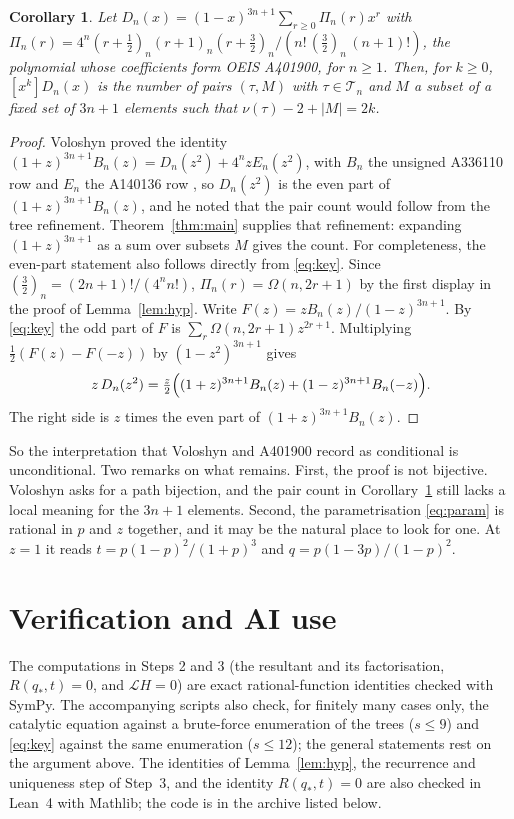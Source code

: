 \documentclass[11pt]{amsart}
\newtheorem{corollary}[theorem]{Corollary}
\theoremstyle{remark}
\newcommand{\Om}{\Omega}
\begin{document}
\begin{corollary}\label{cor:a401900}
Let $D_n(x) = (1-x)^{3n+1}\sum_{r \ge 0}\Pi_n(r)x^r$ with
$\Pi_n(r) = 4^n (r+\frac12)_n (r+1)_n (r+\frac32)_n/(n!\,(\frac32)_n\,(n+1)!)$, the polynomial whose coefficients
form OEIS A401900, for $n \ge 1$. Then, for $k \ge 0$, $[x^k]D_n(x)$ is the number of
pairs $(\tau, M)$ with $\tau \in \mathcal T_n$ and $M$ a subset of a fixed set of $3n+1$ elements such that
$\nu(\tau) - 2 + |M| = 2k$.
\end{corollary}
\begin{proof}
Voloshyn proved the identity $(1+z)^{3n+1}B_n(z) = D_n(z^2) + 4^n z E_n(z^2)$, with $B_n$ the unsigned A336110
row and $E_n$ the A140136 row \cite[eq.~(64)]{V1}, so $D_n(z^2)$ is the even part of $(1+z)^{3n+1}B_n(z)$, and he
noted that the pair count would follow from the tree refinement. Theorem~\ref{thm:main} supplies that refinement:
expanding $(1+z)^{3n+1}$ as a sum over subsets $M$ gives the count. For completeness, the even-part statement also
follows directly from \eqref{eq:key}. Since $(\frac32)_n = (2n+1)!/(4^n n!)$, $\Pi_n(r) = \Om(n,2r+1)$ by the first display in the proof of
Lemma~\ref{lem:hyp}. Write $F(z) = zB_n(z)/(1-z)^{3n+1}$. By \eqref{eq:key} the odd part of $F$ is
$\sum_r \Om(n,2r+1) z^{2r+1}$. Multiplying $\tfrac12(F(z)-F(-z))$ by $(1-z^2)^{3n+1}$ gives
\[
  z\,D_n(z^2) = \tfrac{z}{2}\Bigl((1+z)^{3n+1}B_n(z) + (1-z)^{3n+1}B_n(-z)\Bigr).
\]
The right side is $z$ times the even part of $(1+z)^{3n+1}B_n(z)$.
\end{proof}

So the interpretation that Voloshyn \cite[\S4.6]{V1} and A401900 record as conditional is unconditional. Two remarks on what remains. First, the
proof is not bijective. Voloshyn asks for a path bijection, and the pair count in Corollary~\ref{cor:a401900} still
lacks a local meaning for the $3n+1$ elements. Second, the parametrisation \eqref{eq:param} is rational in $p$ and
$z$ together, and it may be the natural place to look for one. At $z = 1$ it reads $t = p(1-p)^2/(1+p)^3$ and
$q = p(1-3p)/(1-p)^2$.

\section*{Verification and AI use}
The computations in Steps 2 and 3 (the resultant and its factorisation, $R(q_\ast,t) = 0$, and $\mathcal L H = 0$)
are exact rational-function identities checked with SymPy. The accompanying scripts also check, for finitely many
cases only, the catalytic equation against a brute-force enumeration of the trees ($s \le 9$) and \eqref{eq:key}
against the same enumeration ($s \le 12$); the general statements rest on the argument above. The
identities of Lemma~\ref{lem:hyp}, the recurrence and uniqueness step of Step~3, and the identity $R(q_\ast,t)=0$
are also checked in Lean~4 with Mathlib; the code is in the archive listed below.
\end{document}
